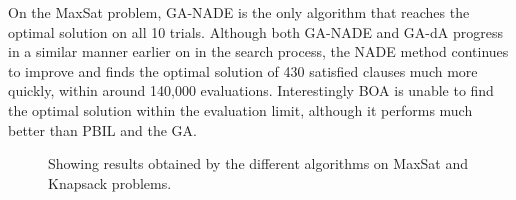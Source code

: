 \documentclass[twoside]{article}
\begin{document}
On the MaxSat problem, GA-NADE is the only algorithm that reaches the optimal solution on all 10 trials. Although both GA-NADE and GA-dA progress in a similar manner earlier on in the search process, the NADE method continues to improve and finds the optimal solution of 430 satisfied clauses much more quickly, within around 140,000 evaluations. Interestingly BOA is unable to find the optimal solution within the evaluation limit, although it performs much better than PBIL and the GA.
\begin{figure}[t!]
\centering
{}
\caption[Optional caption for list of figures]{Showing results obtained by the different algorithms on MaxSat and Knapsack problems.}
\label{figure:results_plots1}
\end{figure}
\end{document}
